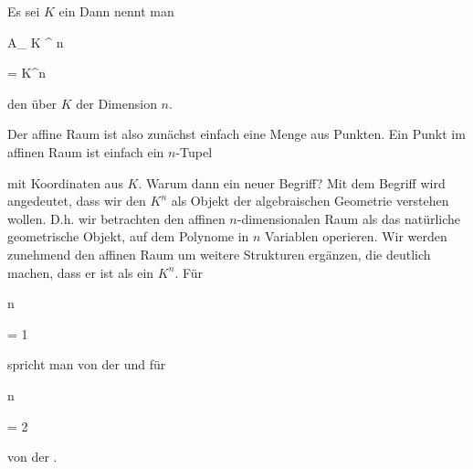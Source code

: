 \setcounter{section}{2}






{}


{


Es sei $K$ ein
Dann nennt man


\mavergleichskette


{\vergleichskette


{ { {\mathbb A}_{  K }^{  n   } }
}


{ = }{ K^n
}


{  }{
}


{    }{
}


{   }{
}


}
{}{}{}
den  über $K$ der Dimension $n$.


}


Der affine Raum ist also zunächst einfach eine Menge aus Punkten. Ein Punkt im affinen Raum ist einfach ein $n$-Tupel


 mit Koordinaten aus $K$. Warum dann ein neuer Begriff? Mit dem Begriff  wird angedeutet, dass wir den $K^n$ als Objekt der algebraischen Geometrie verstehen wollen. D.h. wir betrachten den affinen $n$-dimensionalen Raum als das natürliche geometrische Objekt, auf dem Polynome in $n$ Variablen
 {} {}
operieren. Wir werden zunehmend den affinen Raum um weitere Strukturen
 {} {}
ergänzen, die deutlich machen, dass er  ist als  ein $K^n$. Für


\mavergleichskette


{\vergleichskette


{ n
}


{ = }{ 1
}


{  }{
}


{    }{
}


{   }{
}


}
{}{}{}
spricht man von der  {} und für


\mavergleichskette


{\vergleichskette


{ n
}


{ = }{ 2
}


{  }{
}


{    }{
}


{   }{
}


}
{}{}{}
von der  {.}


